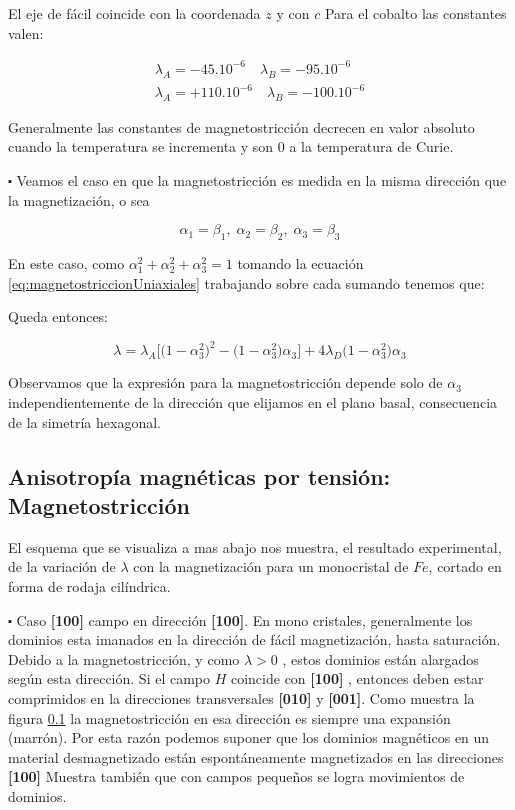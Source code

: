 El eje de fácil coincide con la coordenada $z$ y con $c$ Para el cobalto las constantes valen:

\begin{equation}
\begin{aligned}
	\lambda_{A} = -45.10^{-6} \quad \lambda_{B} = -95.10^{-6} \\
	\lambda_{A} = +110.10^{-6} \quad \lambda_{B} = -100.10^{-6} 
\end{aligned}
\end{equation}

Generalmente las constantes de magnetostricción decrecen en valor absoluto cuando la temperatura se incrementa y son $0$ a la temperatura de Curie.

$\centerdot$ Veamos el caso en que la magnetostricción es medida en la misma dirección que la magnetización, o sea



\begin{equation}
	\alpha_{1}= \beta_{1}, \; \alpha_{2}= \beta_{2}, \; \alpha_{3}= \beta_{3}
\end{equation}

En este caso, como ${\alpha_{1}^{2}+\alpha_{2}^{2}+\alpha_{3}^{2}=1}$ tomando la ecuación \ref{eq:magnetostriccionUniaxiales} trabajando sobre cada sumando tenemos que:

Queda entonces:

\begin{equation}
	\lambda = \lambda_{A} \big[\big(1-\alpha_{3}^{2}\big)^{2}-\big(1-\alpha_{3}^{2}\big)\alpha_{3} \big] + 4\lambda_{D} \big(1-\alpha_{3}^{2}\big)\alpha_{3}
\end{equation}

Observamos que la expresión para la magnetostricción depende solo de $\alpha_{3}$ independientemente de la dirección que elijamos en el plano basal, consecuencia de la simetría hexagonal.

\subsection{Anisotropía magnéticas por tensión: Magnetostricción}

El esquema que se visualiza a mas abajo nos muestra, el resultado experimental, de la variación de $\lambda$ con la magnetización para un monocristal de $Fe$, cortado en forma de rodaja cilíndrica.

$\centerdot$ Caso \textbf{[100]} campo en dirección \textbf{[100]}. En mono cristales, generalmente los dominios esta imanados en la dirección de fácil magnetización, hasta saturación. Debido a la magnetostricción, y como $\lambda>0$ , estos dominios están alargados según esta dirección. Si el campo $H$ coincide con \textbf{[100]} , entonces deben estar comprimidos en la direcciones transversales \textbf{[010]} y \textbf{[001]}. Como muestra la figura \ref{} la magnetostricción en esa dirección es siempre una expansión (marrón). Por esta razón podemos suponer que los dominios magnéticos en un material desmagnetizado están espontáneamente magnetizados en las direcciones \textbf{[100]} Muestra también que con campos pequeños se logra movimientos de dominios.



